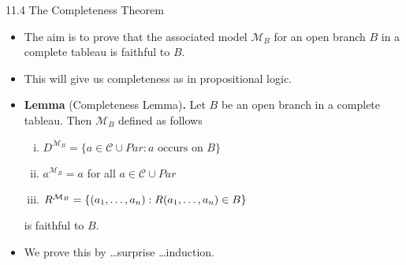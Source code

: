 \begin{frame}{11.4 The Completeness Theorem}

  \begin{itemize}

    \item The aim is to prove that the associated model
      $\mathcal{M}_B$ for an open branch $B$ in a complete tableau is
      faithful to $B$.

    \item This will give us completeness as in propositional logic.

      \item \textbf{Lemma} (Completeness Lemma)\textbf{.} Let $B$ be an open
      branch in a complete tableau. Then $\mathcal{M}_B$ defined as follows
		\begin{enumerate}[(i)]
		
			\item $D^{\mathcal{M}_B}=\{a\in \mathcal{C}\cup Par: a\text{ occurs on }B\}$
			
			\item $a^{\mathcal{M}_B}=a$ for all $a\in \mathcal{C}\cup Par$
			
			\item $R^{\mathcal{M}_B}=\{(a_1, \mathellipsis, a_n): R(a_1, \mathellipsis, a_n)\in B\}$
		
		\end{enumerate}
                is faithful to $B$.

                \item We prove this by \dots surprise \dots induction.
                
  \end{itemize}
  
\end{frame}

